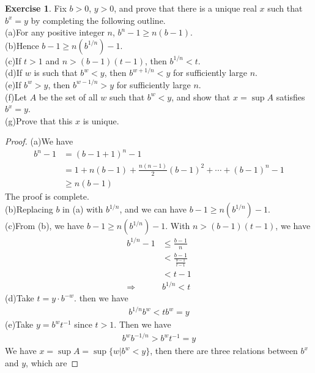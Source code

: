 \documentclass[12pt]{extarticle}
\newcommand{\<}{\langle}
\renewcommand{\>}{\rangle}
\theoremstyle{definition}
\newtheorem{exercise}{Exercise}
\begin{document}
\medskip

\begin{exercise}
Fix $b>0$, $y>0$, and prove that there is a unique real $x$ such that $b^x = y$ by completing the following outline.\\
(a)For any positive integer $n$, $b^n-1\geq n(b-1)$. \\
(b)Hence $b-1\geq n(b^{1/n})-1$. \\
(c)If $t>1$ and $n>(b-1)(t-1)$, then $b^{1/n}<t$. \\
(d)If $w$ is such that $b^w<y$, then $b^{w+1/n}<y$ for sufficiently large $n$. \\
(e)If $b^w>y$, then $b^{w-1/n}>y$ for sufficiently large $n$. \\
(f)Let $A$ be the set of all $w$ such that $b^w<y$, and show that $x=\sup A$ satisfies $b^x=y$. \\
(g)Prove that this $x$ is unique.
\begin{proof}
(a)We have 
\begin{align*}
    b^n-1 & = (b-1+1)^n-1 \\
    & = 1+n(b-1)+\frac{n(n-1)}{2}(b-1)^2+\cdots +(b-1)^n-1\\
    & \geq n(b-1)
\end{align*}
The proof is complete. \\
\hspace*{3em}(b)Replacing $b$ in (a) with $b^{1/n}$, and we can have $b-1\geq n(b^{1/n})-1$.\\
\hspace*{3em}(c)From (b), we have $b-1\geq n(b^{1/n})-1$. With $n>(b-1)(t-1)$, we have 
\begin{align*}
    b^{1/n}-1 & \leq \frac{b-1}{n} \\
    & < \frac{b-1}{\frac{b-1}{t-1}} \\
    & < t-1 \\
    \Rightarrow & b^{1/n}<t
\end{align*}
\hspace*{3em}(d)Take $t=y\cdot b^{-w}$. then we have
\begin{align*}
    b^{1/n}b^w < t b^w = y
\end{align*}
\hspace*{3em}(e)Take $y = b^w t^{-1}$ since $t>1$. Then we have
\begin{align*}
    b^w b^{-1/n} > b^w t^{-1} = y
\end{align*}
\hspace*{3em}We have $x=\sup A = \sup \{w| b^w<y \}$, then there are three relations between $b^x$ and $y$, which are 

\end{proof}
\end{exercise}
\end{document}
